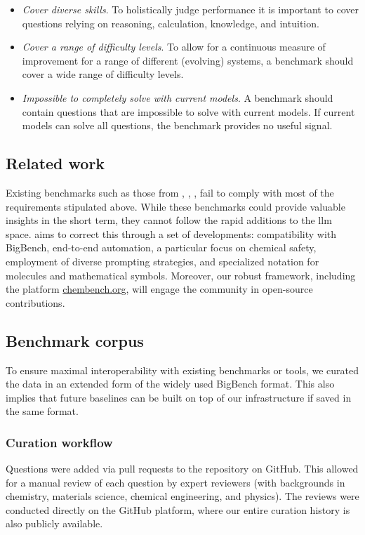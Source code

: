 \begin{itemize}
    \item \emph{Cover diverse skills}. To holistically judge performance it is important to cover questions relying on reasoning, calculation, knowledge, and intuition.
    \item \emph{Cover a range of difficulty levels}. To allow for a continuous measure of improvement for a range of different (evolving) systems, a benchmark should cover a wide range of difficulty levels.
    \item \emph{Impossible to completely solve with current models}. A benchmark should contain questions that are impossible to solve with current models. If current models can solve all questions, the benchmark provides no useful signal.
\end{itemize}

\subsection{Related work}
Existing benchmarks such as those from \textcite{guo2023large}, \textcite{sun2023scieval}, \textcite{Schulze_Balhorn_2024}, \textcite{Cai_2024} fail to comply with most of the requirements stipulated above.
While these benchmarks could provide valuable insights in the short term, they cannot follow the rapid additions to the \gls{llm} space.
\chembench aims to correct this through a set of developments: compatibility with BigBench, end-to-end automation, a particular focus on chemical safety, employment of diverse prompting strategies, and specialized notation for molecules and mathematical symbols.
Moreover, our robust framework, including the platform \url{chembench.org}, will engage the community in open-source contributions.

\clearpage
\subsection{Benchmark corpus}
To ensure maximal interoperability with existing benchmarks or tools, we curated the data in an extended form of the widely used BigBench format.\autocite{srivastava2022beyond}
This also implies that future baselines can be built on top of our infrastructure if saved in the same format.

\subsubsection{Curation workflow}
Questions were added via pull requests to the \chembench repository on GitHub.
This allowed for a manual review of each question by expert reviewers (with backgrounds in chemistry, materials science, chemical engineering, and physics).
The reviews were conducted directly on the GitHub platform, where our entire curation history is also publicly available.

